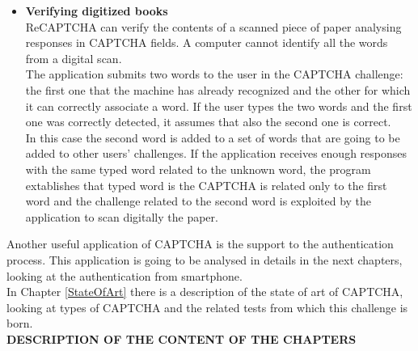 \begin{itemize}
\item{\textbf{Verifying digitized books}\\
ReCAPTCHA can verify the contents of a scanned piece of paper analysing responses in CAPTCHA fields. A computer cannot identify all the words from a digital scan.\\
The application submits two words to the user in the CAPTCHA challenge: the first one that the machine has already recognized and the other for which it can correctly associate a word. If the user types the two words and the first one was correctly detected, it assumes that also the second one is correct.\\
In this case the second word is added to a set of words that are going to be added to other users' challenges. If the application receives enough responses with the same typed word related to the unknown word, the program extablishes that typed word is the CAPTCHA is related only to the first word and the challenge related to the second word is exploited by the application to scan digitally the paper.
}
\end{itemize}
Another useful application of CAPTCHA is the support to the authentication process. This application is going to be analysed in details in the next chapters, looking at the authentication from smartphone.\\
In Chapter \ref{StateOfArt} there is a description of the state of art of CAPTCHA, looking at types of CAPTCHA and the related tests from which this challenge is born.\\
\textbf{DESCRIPTION OF THE CONTENT OF THE CHAPTERS}